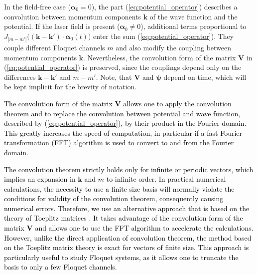 \documentclass[
pra%
,preprint%
,amssymb, nobibnotes, aps, superscriptaddress, floatfix]{revtex4}
\renewcommand{\imath}{\mathrm{i}}
\newcommand{\av}{\boldsymbol{\alpha}}
\newcommand{\kv}{\mathbf{k}}
\newcommand{\phase}{\phi}
\newcommand{\psit}{\widetilde{\psi}}
\newcommand{\Vt}{\widetilde{V}}
\newcommand{\Vmat}{\mathbf{V}}
\newcommand{\Pvec}{\boldsymbol{\psi}}
\newcommand{\Vidx}[1]{\Vt_{#1}}
\newcommand{\Vkp}{\Vt(\kv-\kv')} %
\newcommand{\Pidx}[1]{\psit_{#1}}
\newcommand{\Pmkp}{\Pidx{m}(\kv', t)}
\newcommand{\edit}[1]{\textcolor{black}{#1}}
\newcommand{\tmp}[1]{\textcolor{black}{#1}}
\begin{document}
{%
In the field-free case ($\av_0=0$), the part (\ref{eq:potential_operator}) describes a convolution between momentum components $\kv$ of the wave function  and the potential. If the laser field is present ($\av_0 \neq 0$), additional terms proportional to $ J_{|m-m'|}\big( (\kv-\kv') \cdot \av_0(t) \big)$ enter the sum (\ref{eq:potential_operator}). They couple different Floquet channels $m$ and also modify the coupling between momentum components $\kv$. Nevertheless, the convolution form of the matrix $\Vmat$ in (\ref{eq:potential_operator}) is preserved, since the couplings depend only on the differences $\kv-\kv'$ and $m-m'$. Note, that $\Vmat$ and $\Pvec$ depend on time, which will be kept implicit for the brevity of notation. 
}

\edit{
The convolution form of the matrix $\Vmat$ allows one to apply the convolution theorem and to replace the convolution between potential and wave function,
described by (\ref{eq:potential_operator}), by their product in the Fourier domain. This greatly increases the speed of computation, in particular if a fast Fourier transformation (FFT) algorithm is used to convert to and from the Fourier domain.
}

\edit{
The convolution theorem strictly holds only for infinite or periodic vectors, which implies an expansion in $\kv$ and $m$ to infinite order. In practical numerical calculations, the necessity to use a finite size basis will normally violate the conditions for validity of the convolution theorem, consequently causing numerical errors.
Therefore,
we use an alternative approach that is based on the theory of Toeplitz matrices \cite{doi:10.1137/1.9780898718850}. It takes advantage of the convolution form of the matrix $\Vmat$ and allows one to use the FFT algorithm to accelerate the calculations. However, unlike the direct application of convolution theorem, the method based on the Toeplitz matrix theory is exact for vectors of finite size. 
This approach is particularly useful to study Floquet systems, as it allows one to truncate the basis to only a few Floquet channels. 
}
\end{document}
